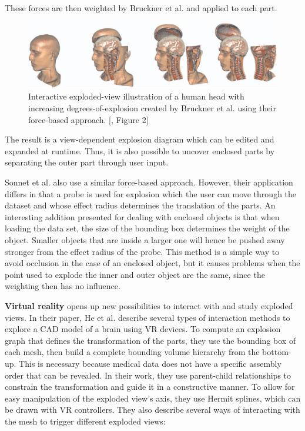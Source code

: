 These forces are then weighted by Bruckner et al. and applied to each part.
\begin{figure}[t]
	\centering
	\includegraphics[width=.95\linewidth]{fig/Images/Bruckner_fig2}
	\caption[]{Interactive exploded-view illustration of a human head with increasing degrees-of-explosion created by Bruckner et al. using their force-based approach. [\cite{Bruckner_2006}, Figure 2]}
\end{figure}
The result is a view-dependent explosion diagram which can be edited and expanded at runtime. 
Thus, it is also possible to uncover enclosed parts by separating the outer part through user input.

Sonnet et al. also use a similar force-based approach.\cite{Sonnet_2004}
However, their application differs in that a probe is used for explosion which the user can move through the dataset and whose effect radius determines the translation of the parts. 
An interesting addition presented for dealing with enclosed objects is that when loading the data set, the size of the bounding box determines the weight of the object. 
Smaller objects that are inside a larger one will hence be pushed away stronger from the effect radius of the probe. 
This method is a simple way to avoid occlusion in the case of an enclosed object, but it causes problems when the point used to explode the inner and outer object are the same, since the weighting then has no influence.

\textbf{Virtual reality} opens up new possibilities to interact with and study exploded views. In their paper, He et al. describe several types of interaction methods to explore a CAD model of a brain using VR devices.\cite{He2017}
To compute an explosion graph that defines the transformation of the parts, they use the bounding box of each mesh, then build a complete bounding volume hierarchy from the bottom-up.
This is necessary because medical data does not have a specific assembly order that can be revealed. 
In their work, they use parent-child relationships to constrain the transformation and guide it in a constructive manner.
To allow for easy manipulation of the exploded view's axis, they use Hermit splines, which can be drawn with VR controllers. They also describe several ways of interacting with the mesh to trigger different exploded views:

